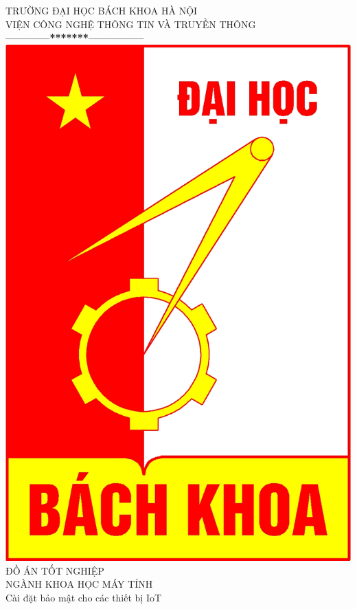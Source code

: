 \documentclass[a4paper,12pt]{report}
\begin{document}
\thispagestyle{empty}
\thisfancypage{
\setlength{\fboxrule}{1pt}
\doublebox}{}

\begin{center}
{\fontsize{16}{19}\selectfont TRƯỜNG ĐẠI HỌC BÁCH KHOA HÀ NỘI\\
VIỆN CÔNG NGHỆ THÔNG TIN VÀ TRUYỀN THÔNG}\\
\textbf{------------*******---------------}\\[1cm]
\includegraphics[scale=0.13]{hust.jpg}\\[1.3cm]
{\fontsize{23}{43}\selectfont ĐỒ ÁN TỐT NGHIỆP}\\[0.1cm]
{\fontsize{25}{10}\selectfont NGÀNH KHOA HỌC MÁY TÍNH}\\[0.9cm]
{\fontsize{20}{24}\selectfont Cài đặt bảo mật cho các thiết bị IoT}\\[2cm]


\end{center}
\end{document}
